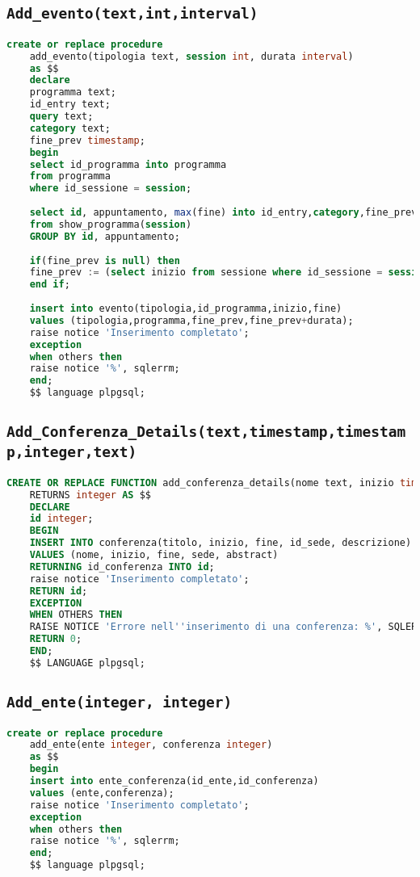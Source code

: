 \subsection{\texttt{Add\_evento(text,int,interval)}}
\begin{lstlisting}[language=SQL,style=mystyle]
	create or replace procedure 
	add_evento(tipologia text, session int, durata interval)
	as $$
	declare
	programma text;
	id_entry text;
	query text;
	category text;
	fine_prev timestamp;
	begin
	select id_programma into programma
	from programma
	where id_sessione = session;
	
	select id, appuntamento, max(fine) into id_entry,category,fine_prev
	from show_programma(session)
	GROUP BY id, appuntamento;
	
	if(fine_prev is null) then
	fine_prev := (select inizio from sessione where id_sessione = session);
	end if;
	
	insert into evento(tipologia,id_programma,inizio,fine)
	values (tipologia,programma,fine_prev,fine_prev+durata);
	raise notice 'Inserimento completato';
	exception
	when others then
	raise notice '%', sqlerrm;
	end;
	$$ language plpgsql;
\end{lstlisting}
\subsection{\texttt{Add\_Conferenza\_Details(text,timestamp,timestamp,integer,text)}}
\begin{lstlisting}[language=SQL,style=mystyle]
	CREATE OR REPLACE FUNCTION add_conferenza_details(nome text, inizio timestamp, fine timestamp, sede integer, abstract text)
	RETURNS integer AS $$
	DECLARE
	id integer;
	BEGIN
	INSERT INTO conferenza(titolo, inizio, fine, id_sede, descrizione) 
	VALUES (nome, inizio, fine, sede, abstract)
	RETURNING id_conferenza INTO id;
	raise notice 'Inserimento completato';
	RETURN id;
	EXCEPTION
	WHEN OTHERS THEN
	RAISE NOTICE 'Errore nell''inserimento di una conferenza: %', SQLERRM;
	RETURN 0; 
	END;
	$$ LANGUAGE plpgsql;
\end{lstlisting}
\subsection{\texttt{Add\_ente(integer, integer)}}
\begin{lstlisting}[language=SQL,style=mystyle]
	create or replace procedure 
	add_ente(ente integer, conferenza integer)
	as $$
	begin
	insert into ente_conferenza(id_ente,id_conferenza)
	values (ente,conferenza);
	raise notice 'Inserimento completato';
	exception
	when others then
	raise notice '%', sqlerrm;
	end;
	$$ language plpgsql;
\end{lstlisting}
